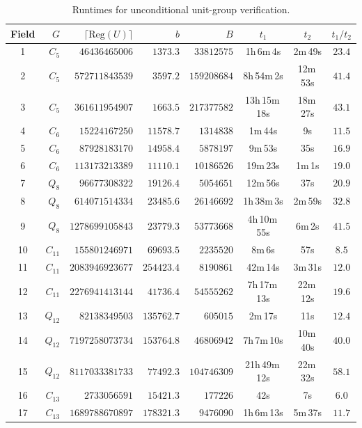\documentclass[12pt, a4paper, usenames]{amsart}
\theoremstyle{plain}
\theoremstyle{remark}
\theoremstyle{definition}
\begin{document}
\begin{table}[ht!]
\caption{Runtimes for unconditional unit-group verification.}
\label{tab:unit-stats}
\begin{tabular}{crrrrccc}
\toprule %
Field & $G$ & $\lceil \mathrm{Reg}(U) \rceil$ & $b$ & $B$ & $t_{1}$ & $t_{2}$ & $t_{1}/t_{2}$ \\
\midrule
1 & $C_{5}$ & $46436465006$  & $1373.3$  & $33812575$  & 1h\,6m\,4s & 2m\,49s & $23.4$ \\
2 & $C_{5}$ & $572711843539$  & $3597.2$  & $159208684$  & 8h\,54m\,2s & 12m\,53s & $41.4$ \\
3 & $C_{5}$ & $361611954907$  & $1663.5$  & $217377582$  & 13h\,15m\,18s & 18m\,27s & $43.1$ \\
\midrule
4 & $C_{6}$ & $15224167250$  & $11578.7$  & $1314838$  & 1m\,44s & 9s & $11.5$ \\
5 & $C_{6}$ & $87928183170$  & $14958.4$  & $5878197$  & 9m\,53s & 35s & $16.9$ \\
6 & $C_{6}$ & $113173213389$  & $11110.1$  & $10186526$  & 19m\,23s & 1m\,1s & $19.0$ \\
\midrule
7 & $Q_8$ & $96677308322$  & $19126.4$  & $5054651$  & 12m\,56s & 37s & $20.9$ \\
8 & $Q_8$ & $614071514334$  & $23485.6$  & $26146692$  & 1h\,38m\,3s & 2m\,59s & $32.8$ \\
9 & $Q_8$ & $1278699105843$  & $23779.3$  & $53773668$  & 4h\,10m\,55s & 6m\,2s & $41.5$ \\
\midrule
10 & $C_{11}$ & $155801246971$  & $69693.5$  & $2235520$  & 8m\,6s & 57s & $8.5$ \\
11 & $C_{11}$ & $2083946923677$  & $254423.4$  & $8190861$  & 42m\,14s & 3m\,31s & $12.0$ \\
12 & $C_{11}$ & $2276941413144$  & $41736.4$  & $54555262$  & 7h\,17m\,13s & 22m\,12s & $19.6$ \\
\midrule
13 & $Q_{12}$ & $82138349503$  & $135762.7$  & $605015$  & 2m\,17s & 11s & $12.4$ \\
14 & $Q_{12}$ & $7197258073734$  & $153764.8$  & $46806942$  & 7h\,7m\,10s & 10m\,40s & $40.0$ \\
15 & $Q_{12}$ & $8117033381733$  & $77492.3$  & $104746309$  & 21h\,49m\,12s & 22m\,32s & $58.1$ \\
\midrule
16 & $C_{13}$ & $2733056591$  & $15421.3$  & $177226$  & 42s & 7s & $6.0$ \\
17 & $C_{13}$ & $1689788670897$  & $178321.3$  & $9476090$  & 1h\,6m\,13s & 5m\,37s & $11.7$ \\

\end{tabular}
\end{table}
\end{document}

